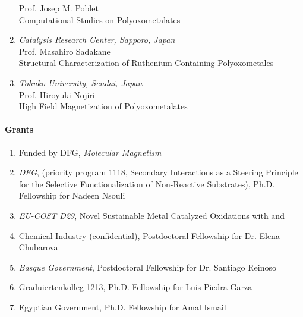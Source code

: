 \begin{enumerate}
  Prof. Josep M. Poblet\\
  Computational Studies on Polyoxometalates
\item {\sl Catalysis Research Center, Sapporo, Japan}\\
  Prof. Masahiro Sadakane\\
  Structural Characterization of Ruthenium-Containing Polyoxometales
\item {\sl Tohuko University, Sendai, Japan} \\ Prof. Hiroyuki Nojiri\\
  High Field Magnetization of Polyoxometalates
\end{enumerate}

\paragraph{Grants}
\begin{enumerate}
\item Funded by DFG, \emph{Molecular Magnetism} \\

\item {\sl DFG}, (priority program 1118, Secondary Interactions as a Steering
  Principle for the Selective Functionalization of Non-Reactive Substrates),
  Ph.D. Fellowship for Nadeen Nsouli \item {\sl EU-COST D29}, Novel Sustainable Metal
  Catalyzed Oxidations with  and 
\item Chemical Industry (confidential), Postdoctoral Fellowship for Dr. Elena
  Chubarova \item {\sl Basque Government}, Postdoctoral Fellowship for Dr. Santiago
  Reinoso \item Graduiertenkolleg 1213, Ph.D. Fellowship for Luis Piedra-Garza
\item Egyptian Government, Ph.D. Fellowship for Amal Ismail
\end{enumerate}

